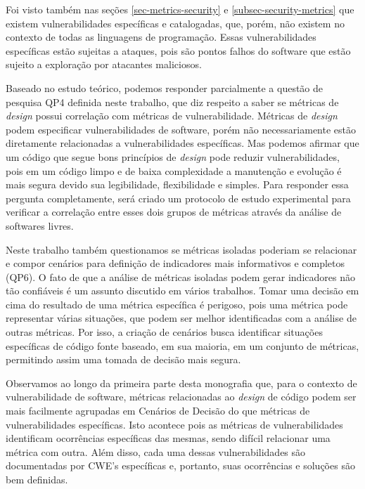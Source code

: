 %

Foi visto também nas seções \ref{sec-metrics-security} e \ref{subsec-security-metrics} que existem vulnerabilidades específicas e catalogadas, que, porém, não existem no contexto de todas as linguagens de programação. Essas vulnerabilidades específicas estão sujeitas a ataques, pois são pontos falhos do software que estão sujeito a exploração por atacantes maliciosos. 

%

Baseado no estudo teórico, podemos responder parcialmente a questão de pesquisa QP4 definida neste trabalho, que diz respeito a saber se métricas de \emph{design} possui correlação com métricas de vulnerabilidade. Métricas de \emph{design} podem especificar vulnerabilidades de software, porém não necessariamente estão diretamente relacionadas a vulnerabilidades específicas. Mas podemos afirmar que um código que segue bons princípios de \emph{design} pode reduzir vulnerabilidades, pois em um código limpo e de baixa complexidade a manutenção e evolução é mais segura devido sua legibilidade, flexibilidade e simples. Para responder essa pergunta completamente, será criado um protocolo de estudo experimental para verificar a correlação entre esses dois grupos de métricas através da análise de softwares livres.
%

Neste trabalho também questionamos se métricas isoladas poderiam se relacionar e compor cenários para definição de indicadores mais informativos e completos (QP6). O fato de que a análise de métricas isoladas podem gerar indicadores não tão confiáveis é um assunto discutido em vários trabalhos. Tomar uma decisão em cima do resultado de uma métrica específica é perigoso, pois uma métrica pode representar várias situações, que podem ser melhor identificadas com a análise de outras métricas. Por isso, a criação de cenários busca identificar situações específicas de código fonte baseado, em sua maioria, em um conjunto de métricas, permitindo assim uma tomada de decisão mais segura. 

%

Observamos ao longo da primeira parte desta monografia que, para o contexto de vulnerabilidade de software, métricas relacionadas ao \emph{design} de código podem ser mais facilmente agrupadas em Cenários de Decisão do que métricas de vulnerabilidades específicas. Isto acontece pois as métricas de vulnerabilidades identificam ocorrências específicas das mesmas, sendo difícil relacionar uma métrica com outra. Além disso, cada uma dessas vulnerabilidades são documentadas por CWE's específicas e, portanto, suas ocorrências e soluções são bem definidas.

